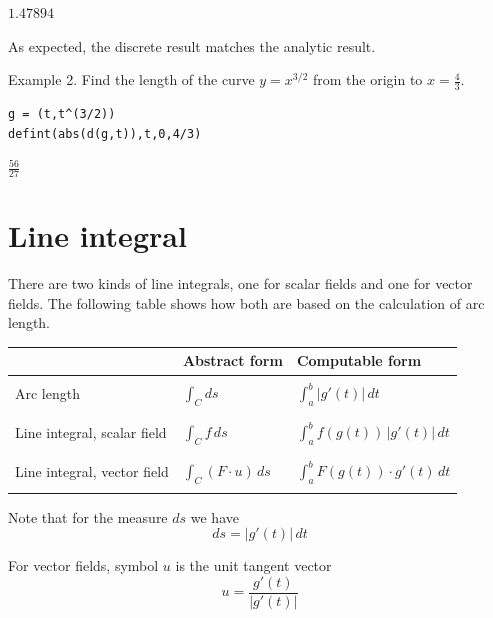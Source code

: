 \documentclass[12pt]{article}
\begin{document}
$1.47894$

\bigskip
As expected, the discrete result matches the analytic result.

\bigskip
Example 2.
Find the length of the curve $y=x^{3/2}$ from the origin to
$x=\tfrac{4}{3}$.

{\color{blue}
\begin{verbatim}
g = (t,t^(3/2))
defint(abs(d(g,t)),t,0,4/3)
\end{verbatim}}

$\displaystyle \tfrac{56}{27}$

\newpage

\section{Line integral}

There are two kinds of line integrals,
one for scalar fields and one for vector fields.
The following table shows how both are based on the calculation of
arc length.

\begin{center}
\begin{tabular}{|l|l|l|}
\hline
& Abstract form
& Computable form
\\
\hline
& &\\
Arc length
& $\displaystyle{\int_C ds}$
& $\displaystyle{\int_a^b |g'(t)|\,dt}$\\
& &\\
\hline
 & & \\
Line integral, scalar field
& $\displaystyle{\int_C f\,ds}$
& $\displaystyle{\int_a^b f(g(t))\,|g'(t)|\,dt}$\\
& &\\
\hline
 & & \\
Line integral, vector field
& $\displaystyle{\int_C(F\cdot u)\,ds}$
& $\displaystyle{\int_a^b F(g(t))\cdot g'(t)\,dt}$\\
 & & \\
\hline
\end{tabular}
\end{center}

Note that for the measure $ds$ we have
\begin{equation*}
ds=|g'(t)|\,dt
\end{equation*}

For vector fields, symbol $u$ is the unit tangent vector
\begin{equation*}
u=\frac{g'(t)}{|g'(t)|}
\end{equation*}
\end{document}

